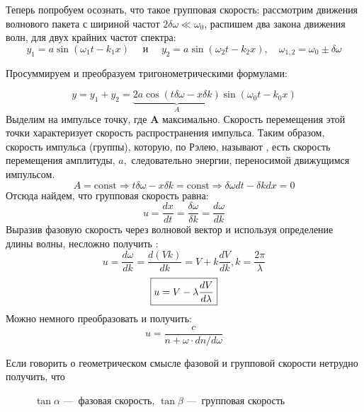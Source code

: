 Теперь попробуем осознать, что такое групповая скорость: рассмотрим движения волнового пакета с шириной частот $2\delta \omega \ll \omega_0$, распишем два закона движения волн, для двух крайних частот спектра: 
\begin{equation}
y_{1}=a \sin \left(\omega_{1} t-k_{1} x\right) \quad \text { и } \quad y_{2}=a \sin \left(\omega_{2} t-k_{2} x\right), \quad \omega_{1,2}= \omega_0 \pm \delta \omega
\end{equation}

Просуммируем и преобразуем тригонометрическими формулами:

\begin{equation}
y=y_{1}+y_{2}=\underbrace{2 a \cos (t \delta \omega-x \delta k)}_{A} \sin \left(\omega_{0} t-k_{0} x\right)
\end{equation}
Выделим на импульсе точку, где $\boldsymbol{A}$ максимально. Скорость перемещения этой
точки характеризует скорость распространения импульса. Таким образом,
скорость импульса (группы), которую, по Рэлею, называют , есть скорость перемещения амплитуды, $a,$ следовательно
энергии, переносимой движущимся импульсом.
\begin{equation}
A=\text {const} \Rightarrow t \delta \omega-x \delta k=\text {const} \Rightarrow \delta \omega d t-\delta k d x=0
\end{equation}
Отсюда найдем, что групповая скорость равна: 
\begin{equation}
u = \frac{dx}{dt} = \frac{\delta \omega}{\delta k} = \frac{d\omega}{dk}
\end{equation}
Выразив фазовую скорость через волновой вектор и используя определение длины волны, несложно получить :
\begin{equation}
u=\frac{d \omega}{d k}=\frac{d(V k)}{d k}=V+k \frac{d V}{d k}, k=\frac{2 \pi}{\lambda}
\end{equation}
\begin{equation}
\fbox{$u=V-\lambda \dfrac{d V}{d \lambda}$}
\end{equation}
Можно немного преобразовать и получить:
\begin{equation}
u=\frac{c}{n+\omega \cdot d n / d \omega}
\end{equation}


Если говорить о геометрическом смысле фазовой и групповой скорости нетрудно получить, что 
\begin{figure}[h]\label{qr}
	\caption{ $\tan\alpha$ --- фазовая скорость, $\tan\beta$ --- групповая скорость}
	\label{fig:image}
\end{figure}
